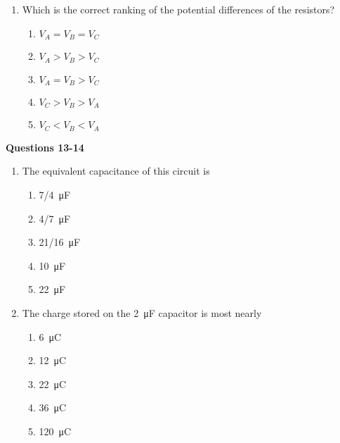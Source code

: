 \documentclass{../../oss-apphys}
\begin{document}
\begin{multicols}{2}
\begin{enumerate}[leftmargin=18pt,resume]
  \item Which is the correct ranking of the potential differences of the
    resistors?
    \begin{enumerate}[noitemsep,topsep=0pt,leftmargin=18pt,label=(\Alph*)]
    \item $V_A = V_B = V_C$
    \item $V_A > V_B > V_C$
    \item $V_A = V_B > V_C$
    \item $V_C > V_B > V_A$
    \item $V_C < V_B < V_A$
    \end{enumerate}
  \end{enumerate}

  \columnbreak
  
  \textbf{Questions 13-14}

  \begin{center}
  \end{center}

  \begin{enumerate}[leftmargin=18pt,resume]
  \item The equivalent capacitance of this circuit is
    \begin{enumerate}[noitemsep,topsep=0pt,leftmargin=18pt,label=(\Alph*)]
    \item\SI{7/4}{\micro\farad}
    \item\SI{4/7}{\micro\farad}
    \item\SI{21/16}{\micro\farad}
    \item\SI{10}{\micro\farad}
    \item\SI{22}{\micro\farad}
    \end{enumerate}
    
  \item The charge stored on the \SI{2}{\micro\farad} capacitor is most nearly
    \begin{enumerate}[noitemsep,topsep=0pt,leftmargin=18pt,label=(\Alph*)]
    \item\SI{6}{\micro\coulomb}
    \item\SI{12}{\micro\coulomb}
    \item\SI{22}{\micro\coulomb}
    \item\SI{36}{\micro\coulomb}
    \item\SI{120}{\micro\coulomb}
    \end{enumerate}


\end{enumerate}
\end{multicols}
\end{document}
